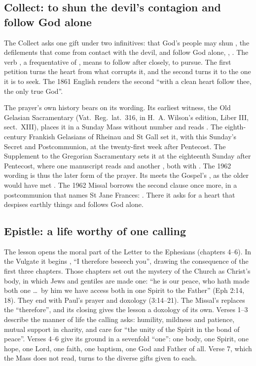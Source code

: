\subsection{Collect: to shun the devil's contagion and follow God alone}

The Collect asks one gift under two infinitives: that God's people may shun
, the defilements that come from contact with the
devil, and follow God alone, , . The verb
, a frequentative of , means to follow after
closely, to pursue. The first petition turns the heart from what corrupts it,
and the second turns it to the one it is to seek. The 1861 English renders the
second ``with a clean heart follow thee, the only true God''.

The prayer's own history bears on its wording. Its earliest witness, the Old
Gelasian Sacramentary (Vat.\ Reg.\ lat.~316, in H.~A. Wilson's edition, Liber
III, sect.~XIII), places it in a Sunday Mass without number and reads . The eighth-century Frankish Gelasians of
Rheinau and St Gall set it, with this Sunday's Secret and Postcommunion, at the
twenty-first week after Pentecost. The Supplement to the Gregorian
Sacramentary sets it at the eighteenth Sunday after Pentecost, where one
manuscript reads  and another , both with . The 1962 wording  is thus the later
form of the prayer. Its  meets the Gospel's , as the older  would have met . The
1962 Missal borrows the second clause once more, in a postcommunion that names
St Jane Frances: . There it asks for a heart that despises earthly things and follows
God alone.

\subsection{Epistle: a life worthy of one calling}

The lesson opens the moral part of the Letter to the Ephesians (chapters
4--6). In the Vulgate it begins , ``I therefore
beseech you'', drawing the consequence of the first three chapters. Those
chapters set out the mystery of the Church as Christ's body, in which Jews and
gentiles are made one: ``he is our peace, who hath made both one \dots\ by him
we have access both in one Spirit to the Father'' (Eph 2:14, 18). They end
with Paul's prayer and doxology (3:14--21). The Missal's 
replaces the ``therefore'', and its closing  gives the lesson a doxology of its own. Verses 1--3
describe the manner of life the calling asks: humility, mildness and
patience, mutual support in charity, and care for ``the unity of the Spirit in
the bond of peace''. Verses 4--6 give its ground in a sevenfold ``one'': one
body, one Spirit, one hope, one Lord, one faith, one baptism, one God and
Father of all. Verse 7, which the Mass does not read, turns to the diverse
gifts given to each.

